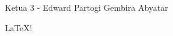 \documentclass{article}
\begin{document}
Ketua 3 - Edward Partogi Gembira Abyatar

\LaTeX!
\end{document}
